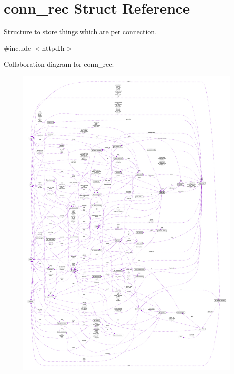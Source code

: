 \hypertarget{structconn__rec}{}\section{conn\+\_\+rec Struct Reference}
\label{structconn__rec}


Structure to store things which are per connection.  




{\ttfamily \#include $<$httpd.\+h$>$}



Collaboration diagram for conn\+\_\+rec\+:
\nopagebreak
\begin{figure}[H]
\begin{center}
\leavevmode
\includegraphics[width=350pt]{structconn__rec__coll__graph}
\end{center}
\end{figure}

